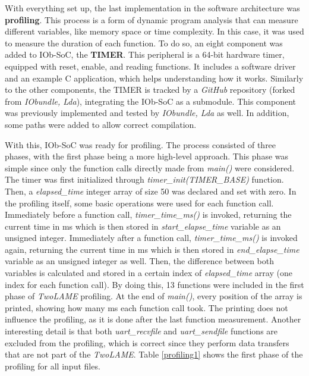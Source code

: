 \documentclass{article}
\begin{document}
With everything set up, the last implementation in the software architecture was \textbf{profiling}. This process is a form of dynamic program analysis that can measure different variables, like memory space or time complexity. In this case, it was used to measure the duration of each function.
To do so, an eight component was added to IOb-SoC, the \textbf{TIMER}. This peripheral is a 64-bit hardware timer, equipped with reset, enable, and reading functions. It includes a software driver and an example C application, which helps understanding how it works. 
Similarly to the other components, the TIMER is tracked by a \textit{GitHub} repository (forked from \textit{IObundle, Lda}), integrating the IOb-SoC as a submodule. This component was previously implemented and tested by \textit{IObundle, Lda} as well. In addition, some paths were added to allow correct compilation.

With this, IOb-SoC was ready for profiling. The process consisted of three phases, with the first phase being a more high-level approach. 
This phase was simple since only the function calls directly made from \textit{main()} were considered. The timer was first initialized through \textit{timer\_init(TIMER\_BASE)} function. Then, a \textit{elapsed\_time} integer array of size 50 was declared and set with zero. In the profiling itself, some basic operations were used for each function call. Immediately before a function call, \textit{timer\_time\_ms()} is invoked, returning the current time in ms which is then stored in \textit{start\_elapse\_time} variable as an unsigned integer. Immediately after a function call, \textit{timer\_time\_ms()} is invoked again, returning the current time in ms which is then stored in \textit{end\_elapse\_time} variable as an unsigned integer as well. Then, the difference between both variables is calculated and stored in a certain index of \textit{elapsed\_time} array (one index for each function call). 
By doing this, 13 functions were included in the first phase of \textit{TwoLAME} profiling. At the end of \textit{main()}, every position of the array is printed, showing how many ms each function call took. The printing does not influence the profiling, as it is done after the last function measurement. Another interesting detail is that both \textit{uart\_recvfile} and \textit{uart\_sendfile} functions are excluded from the profiling, which is correct since they perform data transfers that are not part of the \textit{TwoLAME}.
Table \ref{profiling1} shows the first phase of the profiling for all input files.
\end{document}
